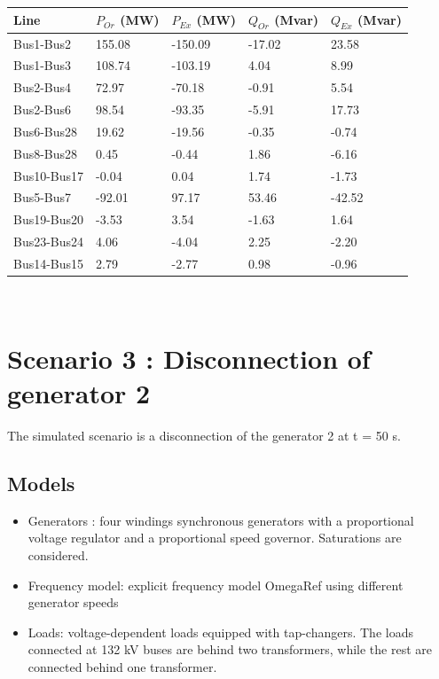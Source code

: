 \documentclass[a4paper, 12pt]{report}
\begin{document}
\begin{tabular}{ | m{2.5cm} | m{2.5cm}| m{2.5cm} | m{2.5cm} | m{2.5cm} | }
  \hline
  \textbf{Line} & \textbf{$P_{Or}$ (MW)} & \textbf{$P_{Ex}$ (MW)} & \textbf{$Q_{Or}$ (Mvar)} & \textbf{$Q_{Ex}$ (Mvar)} \\
  \hline
  Bus1-Bus2 & 155.08 & -150.09 & -17.02 & 23.58 \\
  \hline
  Bus1-Bus3 & 108.74 & -103.19 & 4.04 & 8.99 \\
  \hline
  Bus2-Bus4 & 72.97 & -70.18 & -0.91 & 5.54 \\
  \hline
  Bus2-Bus6 & 98.54 & -93.35 & -5.91 & 17.73 \\
  \hline
  Bus6-Bus28 & 19.62 & -19.56 & -0.35 & -0.74 \\
  \hline
  Bus8-Bus28 & 0.45 & -0.44 & 1.86 & -6.16 \\
  \hline
  Bus10-Bus17 & -0.04 & 0.04 & 1.74 & -1.73 \\
  \hline
  Bus5-Bus7 & -92.01 & 97.17 & 53.46 & -42.52 \\
  \hline
  Bus19-Bus20 & -3.53 & 3.54 & -1.63 & 1.64 \\
  \hline
  Bus23-Bus24 & 4.06 & -4.04 & 2.25 & -2.20 \\
  \hline
  Bus14-Bus15 & 2.79 & -2.77 & 0.98 & -0.96 \\
  \hline
\end{tabular} \\

\chapter{Scenario 3 : Disconnection of generator 2}

The simulated scenario is a disconnection of the generator 2 at t = 50 s.

\section{Models}

\begin{itemize}
  \item Generators : four windings synchronous generators with a proportional voltage regulator and a proportional speed governor. Saturations are considered.
  \item Frequency model: explicit frequency model OmegaRef using different generator speeds
  \item Loads: voltage-dependent loads equipped with tap-changers. The loads connected at 132 kV buses are behind two transformers, while the rest are connected behind one transformer.
\end{itemize}
\end{document}
